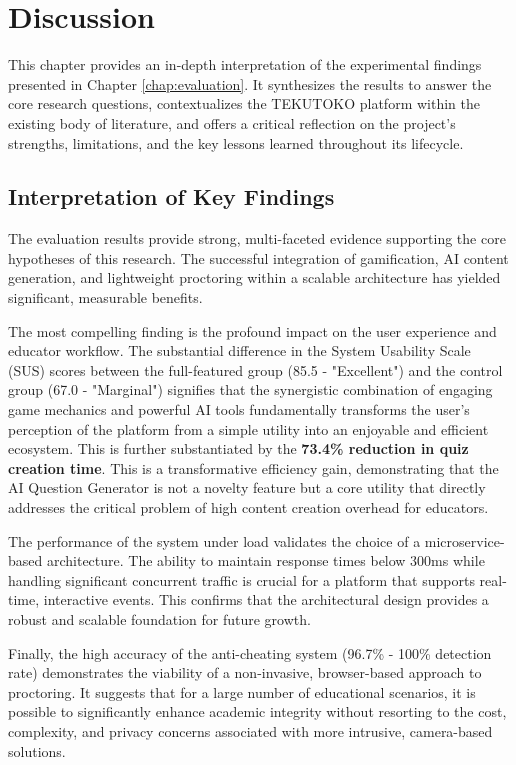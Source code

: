 \chapter{Discussion}
\label{chap:discussion}

This chapter provides an in-depth interpretation of the experimental findings presented in Chapter \ref{chap:evaluation}. It synthesizes the results to answer the core research questions, contextualizes the TEKUTOKO platform within the existing body of literature, and offers a critical reflection on the project's strengths, limitations, and the key lessons learned throughout its lifecycle.

\section{Interpretation of Key Findings}
\label{sec:discussion-interpretation}
The evaluation results provide strong, multi-faceted evidence supporting the core hypotheses of this research. The successful integration of gamification, AI content generation, and lightweight proctoring within a scalable architecture has yielded significant, measurable benefits.

The most compelling finding is the profound impact on the user experience and educator workflow. The substantial difference in the System Usability Scale (SUS) scores between the full-featured group (85.5 - "Excellent") and the control group (67.0 - "Marginal") signifies that the synergistic combination of engaging game mechanics and powerful AI tools fundamentally transforms the user's perception of the platform from a simple utility into an enjoyable and efficient ecosystem. This is further substantiated by the \textbf{73.4\% reduction in quiz creation time}. This is a transformative efficiency gain, demonstrating that the AI Question Generator is not a novelty feature but a core utility that directly addresses the critical problem of high content creation overhead for educators.

The performance of the system under load validates the choice of a microservice-based architecture. The ability to maintain response times below 300ms while handling significant concurrent traffic is crucial for a platform that supports real-time, interactive events. This confirms that the architectural design provides a robust and scalable foundation for future growth.

Finally, the high accuracy of the anti-cheating system (96.7\% - 100\% detection rate) demonstrates the viability of a non-invasive, browser-based approach to proctoring. It suggests that for a large number of educational scenarios, it is possible to significantly enhance academic integrity without resorting to the cost, complexity, and privacy concerns associated with more intrusive, camera-based solutions.

